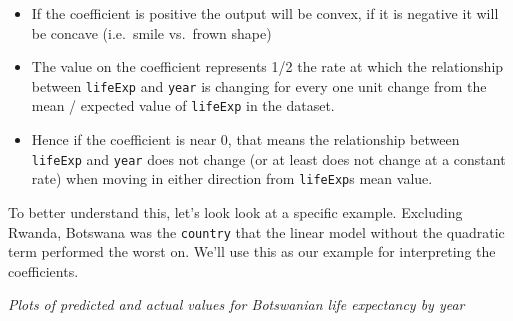 \documentclass[]{book}
\newenvironment{Shaded}{\begin{snugshade}}{\end{snugshade}}
\newcommand{\DataTypeTok}[1]{\textcolor[rgb]{0.13,0.29,0.53}{#1}}
\newcommand{\KeywordTok}[1]{\textcolor[rgb]{0.13,0.29,0.53}{\textbf{#1}}}
\newcommand{\NormalTok}[1]{#1}
\newcommand{\OperatorTok}[1]{\textcolor[rgb]{0.81,0.36,0.00}{\textbf{#1}}}
\newcommand{\StringTok}[1]{\textcolor[rgb]{0.31,0.60,0.02}{#1}}
\providecommand{\tightlist}{%
  \setlength{\itemsep}{0pt}\setlength{\parskip}{0pt}}
\theoremstyle{definition}
\theoremstyle{definition}
\theoremstyle{definition}
\theoremstyle{remark}
\begin{document}
\begin{enumerate}
\begin{itemize}
    \begin{itemize}
    \tightlist
    \item
      If the coefficient is positive the output will be convex, if it is
      negative it will be concave (i.e.~smile vs.~frown shape)
    \item
      The value on the coefficient represents 1/2 the rate at which the
      relationship between \texttt{lifeExp} and \texttt{year} is
      changing for every one unit change from the mean / expected value
      of \texttt{lifeExp} in the dataset.
    \item
      Hence if the coefficient is near 0, that means the relationship
      between \texttt{lifeExp} and \texttt{year} does not change (or at
      least does not change at a constant rate) when moving in either
      direction from \texttt{lifeExp}s mean value.
    \end{itemize}
  \end{itemize}

  To better understand this, let's look look at a specific example.
  Excluding Rwanda, Botswana was the \texttt{country} that the linear
  model without the quadratic term performed the worst on. We'll use
  this as our example for interpreting the coefficients.

  \emph{Plots of predicted and actual values for Botswanian life
  expectancy by year}

\begin{Shaded}
\end{Shaded}


\end{enumerate}
\end{document}
